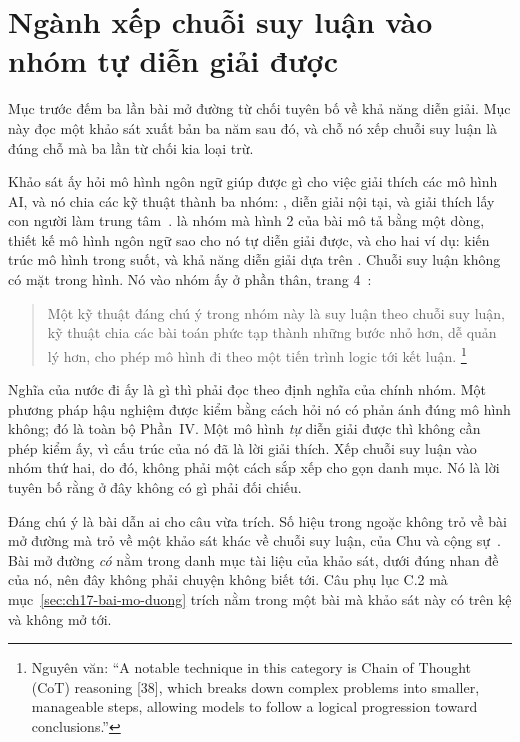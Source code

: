\section{Ngành xếp chuỗi suy luận vào nhóm tự diễn giải được}
\label{sec:ch17-nganh-doc-nguoc-lai}

%
Mục trước đếm ba lần bài mở đường từ chối tuyên bố về khả năng diễn giải. Mục
này đọc một khảo sát xuất bản ba năm sau đó, và chỗ nó xếp chuỗi suy luận là
đúng chỗ mà ba lần từ chối kia loại trừ.

%
Khảo sát ấy hỏi mô hình ngôn ngữ giúp được gì cho việc giải thích các mô hình AI,
và nó chia các kỹ thuật thành ba nhóm:
, diễn giải nội tại, và giải
thích lấy con người làm trung tâm~\autocite{p16llmxai}.
 là nhóm mà hình 2 của bài mô
tả bằng một dòng, thiết kế mô hình ngôn ngữ sao cho nó tự diễn giải được, và cho
hai ví dụ: kiến trúc mô hình trong suốt, và khả năng diễn giải dựa trên
. Chuỗi suy luận không có mặt trong hình.
Nó vào nhóm ấy ở phần thân, trang 4~\autocite{p16llmxai}:

\begin{quote}
Một kỹ thuật đáng chú ý trong nhóm này là suy luận theo chuỗi suy luận, kỹ thuật
chia các bài toán phức tạp thành những bước nhỏ hơn, dễ quản lý hơn, cho phép mô
hình đi theo một tiến trình logic tới kết luận.%
\footnote{Nguyên văn: \enquote{A notable technique in this category is Chain of
Thought (CoT) reasoning [38], which breaks down complex problems into smaller,
manageable steps, allowing models to follow a logical progression toward
conclusions.}}
\end{quote}

Nghĩa của nước đi ấy là gì thì phải đọc theo định nghĩa của chính nhóm. Một
phương pháp hậu nghiệm được kiểm bằng cách hỏi nó có phản ánh đúng mô hình
không; đó là toàn bộ Phần~IV. Một mô hình \emph{tự} diễn giải được thì không cần
phép kiểm ấy, vì cấu trúc của nó đã là lời giải thích. Xếp chuỗi suy luận vào
nhóm thứ hai, do đó, không phải một cách sắp xếp cho gọn danh mục. Nó là lời
tuyên bố rằng ở đây không có gì phải đối chiếu.

%
Đáng chú ý là bài dẫn ai cho câu vừa trích. Số hiệu trong ngoặc không trỏ về bài
mở đường mà trỏ về một khảo sát khác về chuỗi suy luận, của Chu và cộng
sự~\autocite{p16llmxai}. Bài mở đường \emph{có} nằm trong danh mục tài liệu của
khảo sát, dưới đúng nhan đề của nó, nên đây không phải chuyện không biết tới.
Câu phụ lục C.2 mà mục~\ref{sec:ch17-bai-mo-duong} trích nằm trong một bài mà
khảo sát này có trên kệ và không mở tới.

